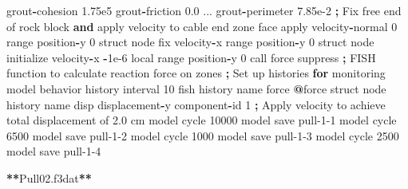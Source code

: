 \documentclass[a4paper, nobind]{templates/ociamthesis}
\newenvironment{Shaded}{\begin{snugshade}}{\end{snugshade}}
\newcommand{\BuiltInTok}[1]{#1}
\newcommand{\ControlFlowTok}[1]{\textcolor[rgb]{0.13,0.29,0.53}{\textbf{#1}}}
\newcommand{\DecValTok}[1]{\textcolor[rgb]{0.00,0.00,0.81}{#1}}
\newcommand{\FloatTok}[1]{\textcolor[rgb]{0.00,0.00,0.81}{#1}}
\newcommand{\KeywordTok}[1]{\textcolor[rgb]{0.13,0.29,0.53}{\textbf{#1}}}
\newcommand{\NormalTok}[1]{#1}
\newcommand{\OperatorTok}[1]{\textcolor[rgb]{0.81,0.36,0.00}{\textbf{#1}}}
\newcommand{\StringTok}[1]{\textcolor[rgb]{0.31,0.60,0.02}{#1}}
\renewenvironment{Shaded}
{
  \vspace{10pt}%
  \begin{snugshade}%
}{%
  \end{snugshade}%
  \vspace{8pt}%
}
\begin{document}
\begin{Shaded}
\begin{Highlighting}[]
\NormalTok{                          grout}\OperatorTok{{-}}\NormalTok{cohesion }\FloatTok{1.75e5}\NormalTok{ grout}\OperatorTok{{-}}\NormalTok{friction }\FloatTok{0.0}\NormalTok{ ...}
\NormalTok{                          grout}\OperatorTok{{-}}\NormalTok{perimeter }\FloatTok{7.85e{-}2}
    \OperatorTok{;}\NormalTok{ Fix free end of rock block }\KeywordTok{and} \BuiltInTok{apply}\NormalTok{ velocity to cable end}
\NormalTok{    zone face }\BuiltInTok{apply}\NormalTok{ velocity}\OperatorTok{{-}}\NormalTok{normal }\DecValTok{0} \BuiltInTok{range}\NormalTok{ position}\OperatorTok{{-}}\NormalTok{y }\DecValTok{0}
\NormalTok{    struct node fix velocity}\OperatorTok{{-}}\NormalTok{x                    }\BuiltInTok{range}\NormalTok{ position}\OperatorTok{{-}}\NormalTok{y }\DecValTok{0}
\NormalTok{    struct node initialize velocity}\OperatorTok{{-}}\NormalTok{x }\OperatorTok{{-}}\FloatTok{1e{-}6}\NormalTok{ local }\BuiltInTok{range}\NormalTok{ position}\OperatorTok{{-}}\NormalTok{y }\DecValTok{0}
\NormalTok{    call }\StringTok{\textquotesingle{}force\textquotesingle{}}\NormalTok{ suppress }\OperatorTok{;}\NormalTok{ FISH function to calculate reaction force on zones}
    \OperatorTok{;}\NormalTok{ Set up histories }\ControlFlowTok{for}\NormalTok{ monitoring model behavior}
\NormalTok{    history interval }\DecValTok{10}
\NormalTok{    fish history name }\StringTok{\textquotesingle{}force\textquotesingle{}} \OperatorTok{@}\NormalTok{force}
\NormalTok{    struct node history name }\StringTok{\textquotesingle{}disp\textquotesingle{}}\NormalTok{ displacement}\OperatorTok{{-}}\NormalTok{y component}\OperatorTok{{-}}\BuiltInTok{id} \DecValTok{1}
    \OperatorTok{;}\NormalTok{ Apply velocity to achieve total displacement of }\FloatTok{2.0}\NormalTok{ cm}
\NormalTok{    model cycle }\DecValTok{10000}
\NormalTok{    model save }\StringTok{\textquotesingle{}pull{-}1{-}1\textquotesingle{}}
\NormalTok{    model cycle }\DecValTok{6500}
\NormalTok{    model save }\StringTok{\textquotesingle{}pull{-}1{-}2\textquotesingle{}}
\NormalTok{    model cycle }\DecValTok{1000}
\NormalTok{    model save }\StringTok{\textquotesingle{}pull{-}1{-}3\textquotesingle{}}
\NormalTok{    model cycle }\DecValTok{2500}
\NormalTok{    model save }\StringTok{\textquotesingle{}pull{-}1{-}4\textquotesingle{}}

\OperatorTok{**}\NormalTok{Pull02.f3dat}\OperatorTok{**}


\end{Highlighting}
\end{Shaded}
\end{document}

